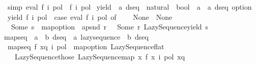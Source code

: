 \begin{isabellebody}
\isanewline
\ \ {\isacharbrackleft}{\kern0pt}simp{\isacharbrackright}{\kern0pt}{\isacharcolon}{\kern0pt}\ {\isachardoublequoteopen}eval\ f\ i\ pol\ {\isacharequal}{\kern0pt}\ f\ i\ pol{\isachardoublequoteclose}\isanewline
\isanewline
{}\isamarkupfalse%
\ yield\ {\isacharcolon}{\kern0pt}{\isacharcolon}{\kern0pt}\ {\isachardoublequoteopen}{\isacharprime}{\kern0pt}a\ dseq\ {\isasymRightarrow}\ natural\ {\isasymRightarrow}\ bool\ {\isasymRightarrow}\ {\isacharparenleft}{\kern0pt}{\isacharprime}{\kern0pt}a\ {\isasymtimes}\ {\isacharprime}{\kern0pt}a\ dseq{\isacharparenright}{\kern0pt}\ option{\isachardoublequoteclose}\ \isanewline
{}\isanewline
\ \ {\isachardoublequoteopen}yield\ f\ i\ pol\ {\isacharequal}{\kern0pt}\ {\isacharparenleft}{\kern0pt}case\ eval\ f\ i\ pol\ of\isanewline
\ \ \ \ None\ {\isasymRightarrow}\ None\isanewline
\ \ {\isacharbar}{\kern0pt}\ Some\ s\ {\isasymRightarrow}\ {\isacharparenleft}{\kern0pt}map{\isacharunderscore}{\kern0pt}option\ {\isasymcirc}\ apsnd{\isacharparenright}{\kern0pt}\ {\isacharparenleft}{\kern0pt}{\isasymlambda}r\ {\isacharunderscore}{\kern0pt}\ {\isacharunderscore}{\kern0pt}{\isachardot}{\kern0pt}\ Some\ r{\isacharparenright}{\kern0pt}\ {\isacharparenleft}{\kern0pt}Lazy{\isacharunderscore}{\kern0pt}Sequence{\isachardot}{\kern0pt}yield\ s{\isacharparenright}{\kern0pt}{\isacharparenright}{\kern0pt}{\isachardoublequoteclose}\isanewline
\isanewline
{}\isamarkupfalse%
\ map{\isacharunderscore}{\kern0pt}seq\ {\isacharcolon}{\kern0pt}{\isacharcolon}{\kern0pt}\ {\isachardoublequoteopen}{\isacharparenleft}{\kern0pt}{\isacharprime}{\kern0pt}a\ {\isasymRightarrow}\ {\isacharprime}{\kern0pt}b\ dseq{\isacharparenright}{\kern0pt}\ {\isasymRightarrow}\ {\isacharprime}{\kern0pt}a\ lazy{\isacharunderscore}{\kern0pt}sequence\ {\isasymRightarrow}\ {\isacharprime}{\kern0pt}b\ dseq{\isachardoublequoteclose}\isanewline
{}\isanewline
\ \ {\isachardoublequoteopen}map{\isacharunderscore}{\kern0pt}seq\ f\ xq\ i\ pol\ {\isacharequal}{\kern0pt}\ map{\isacharunderscore}{\kern0pt}option\ Lazy{\isacharunderscore}{\kern0pt}Sequence{\isachardot}{\kern0pt}flat\isanewline
\ \ \ \ {\isacharparenleft}{\kern0pt}Lazy{\isacharunderscore}{\kern0pt}Sequence{\isachardot}{\kern0pt}those\ {\isacharparenleft}{\kern0pt}Lazy{\isacharunderscore}{\kern0pt}Sequence{\isachardot}{\kern0pt}map\ {\isacharparenleft}{\kern0pt}{\isasymlambda}x{\isachardot}{\kern0pt}\ f\ x\ i\ pol{\isacharparenright}{\kern0pt}\ xq{\isacharparenright}{\kern0pt}{\isacharparenright}{\kern0pt}{\isachardoublequoteclose}\isanewline

\end{isabellebody}
